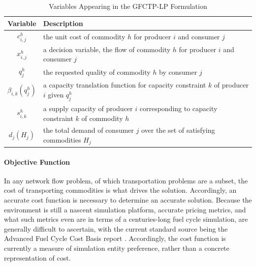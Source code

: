 \begin{table} [h!]
\centering
\begin{tabularx}{\columnwidth-10pt}{|c|X|} %
\hline
Variable    & Description \\
\hline
$c_{i,j}^{h}$             & the unit cost of commodity $h$ 
                          for producer $i$ and consumer $j$  \\
$x_{i,j}^{h}$             & a decision variable, the flow of commodity $h$ 
                          for producer $i$ and consumer $j$  \\
$q_{j}^{h}$               & the requested quality of commodity $h$ 
                          by consumer $j$  \\
$\beta_{i,k}(q_{j}^{h})$  & a capacity translation function for capacity 
                          constraint $k$ of producer $i$ given $q_{j}^{h}$ \\
$s_{i,k}^{h}$             & a supply capacity of producer $i$ corresponding to 
                          capacity constraint $k$ of commodity $h$ \\
$d_{j}(H_{j})$            & the total demand of consumer $j$ over the set of 
                          satisfying commodities $H_{j}$ \\
\hline
\end{tabularx}
\caption{Variables Appearing in the GFCTP-LP Formulation}
\label{tbl:GFCTP-LP-vars}
\end{table}

\paragraph{Objective Function}

In any network flow problem, of which transportation problems are a subset, the
cost of transporting commodities is what drives the solution. Accordingly, an
accurate cost function is necessary to determine an accurate solution. Because
the \Cyclus environment is still a nascent simulation platform, accurate pricing
metrics, and what such metrics even are in terms of a centuries-long fuel cycle
simulation, are generally difficult to ascertain, with the current standard source
being the Advanced Fuel Cycle Cost Basis
report \cite{shropshire_advanced_2009}. Accordingly, the cost function is
currently a measure of simulation entity preference, rather than a concrete
representation of cost.

